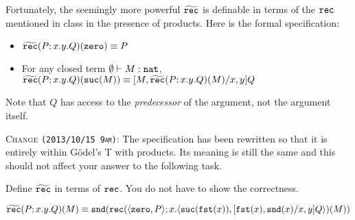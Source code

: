 \documentclass[12pt]{article}
\newcommand{\cut}[1]{}
\newcommand{\showsol}[1]{\color{FireBrick}#1\normalcolor}%
\newcommand{\showsol}[1]{\cut{#1}}%
\newenvironment{sol}{\trivlist \item[\hskip \labelsep{\bf
Solution:}]}{\endtrivlist}
\newcommand{\showextra}[1]{\color{DarkOliveGreen}#1\normalcolor}
\begin{document}
Fortunately, the seemingly more powerful $\widetilde{\mathtt{rec}}$
is definable in terms of the $\mathtt{rec}$ mentioned in class
in the presence of products.
Here is the formal specification:
\begin{itemize}
  \item $\widetilde{\mathtt{rec}}(P; x.y.Q)(\mathtt{zero}) \equiv P$
  \item \showextra{For any closed term $\emptyset \vdash M : \mathtt{nat}$,}\\
    $\widetilde{\mathtt{rec}}(P; x.y.Q)(\mathtt{suc}(M)) \equiv [M,\widetilde{\mathtt{rec}}(P;x.y.Q)(M)/x,y]Q$
\end{itemize}
Note that $Q$ has access to the \emph{predecessor} of the argument,
not the argument itself.
\showextra{
  \begin{mdframed}[style=extra]
    \textsc{Change \texttt{(2013/10/15 9am)}:}
    The specification has been rewritten so that it is entirely within G\"odel's T with products.
    Its meaning is still the same and this should not affect your answer
    to the following task.
  \end{mdframed}
}
\begin{task}
  Define $\widetilde{\mathtt{rec}}$ in terms of $\mathtt{rec}$.
  You do not have to show the correctness.
\end{task}
\showsol{
  \begin{sol}
    \[
      \widetilde{\mathtt{rec}}(P; x.y.Q)(M) \equiv \mathtt{snd}(\mathtt{rec}(\langle \mathtt{zero},P\rangle; x.\langle \mathtt{suc}(\mathtt{fst}(x)),[\mathtt{fst}(x), \mathtt{snd}(x)/x, y]Q\rangle)(M))
    \]
  \end{sol}
}
\end{document}
